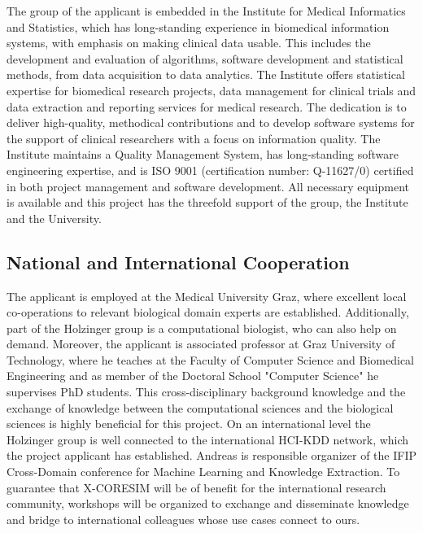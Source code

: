 \documentclass[a4paper,11pt]{article}
\begin{document}
The group of the applicant is embedded in the Institute for Medical Informatics and Statistics, which has long-standing experience in biomedical information systems, with emphasis on making clinical data usable. This includes the development and evaluation of algorithms, software development and statistical methods, from data acquisition to data analytics. The Institute offers statistical expertise for biomedical research projects, data management for clinical trials and data extraction and reporting services for medical research. The dedication is to deliver high-quality, methodical contributions and to develop software systems for the support of clinical researchers with a focus on information quality. The Institute maintains a Quality Management System, has long-standing software engineering expertise, and is ISO 9001 (certification number: Q-11627/0) certified in both project management and software development. All necessary equipment is available and this project has the threefold support of the group, the Institute and the University.



\subsection{National and International Cooperation}

The applicant is employed at the Medical University Graz, where excellent local co-operations to relevant biological domain experts are established. Additionally, part of the Holzinger group is a computational biologist, who can also help on demand. Moreover, the applicant is associated professor at Graz University of Technology, where he teaches at the Faculty of Computer Science and Biomedical Engineering and as member of the Doctoral School "Computer Science" he supervises PhD students. This cross-disciplinary background knowledge and the exchange of knowledge between the computational sciences and the biological sciences is highly beneficial for this project. On an international level the Holzinger group is well connected to the international HCI-KDD network, which the project applicant has established. Andreas is responsible organizer of the IFIP Cross-Domain conference for Machine Learning and Knowledge Extraction. To guarantee that X-CORESIM will be of benefit for the international research community, workshops will be organized to exchange and disseminate knowledge and bridge to international colleagues whose use cases connect to ours.
\end{document}
